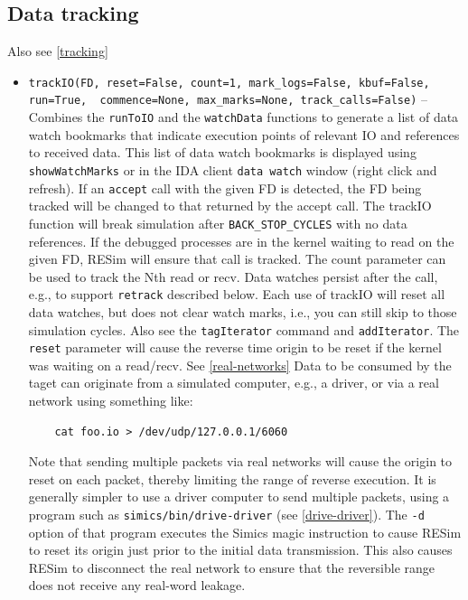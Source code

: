 \documentclass[titlepage]{article}
\begin{document}
\subsection{Data tracking}
Also see \ref{tracking}
\begin{itemize}

\item {\tt trackIO(FD, reset=False, count=1, mark\_logs=False, kbuf=False, run=True, \
             commence=None, max\_marks=None, track\_calls=False)} -- Combines the {\tt runToIO} and the {\tt watchData} functions to generate a list of data watch bookmarks that indicate execution
points of relevant IO and references to received data.  This list of data watch bookmarks is displayed using {\tt showWatchMarks} or in the IDA client {\tt data watch} window (right click and refresh).
If an {\tt accept} call with the given FD is detected, the FD being tracked will be changed to that returned by the accept call.
The trackIO function will break simulation after {\tt BACK\_STOP\_CYCLES} with no data references. If the debugged processes are in the kernel waiting to read on the given
FD, RESim will ensure that call is tracked.  The count parameter can be used to track the Nth read or recv.   Data watches persist after the
call, e.g., to support {\tt retrack} described below.  Each use of trackIO will reset all data watches, but does not clear watch marks, i.e., you can still skip to those simulation cycles.  Also see 
the {\tt tagIterator} command and {\tt addIterator}.  The {\tt reset} parameter will cause the reverse time origin to be reset if the kernel was waiting on a read/recv. See \ref{real-networks}  Data to be consumed by the taget can originate from a simulated computer, e.g., a driver, or via a real network using something like:
\begin{verbatim}
    cat foo.io > /dev/udp/127.0.0.1/6060 
\end{verbatim}
\noindent Note that sending multiple packets via real networks will cause the origin to reset on each packet, thereby limiting the range of reverse execution.  It is generally simpler
to use a driver computer to send multiple packets, using a program such as {\tt simics/bin/drive-driver} (see \ref{drive-driver}).  The {\tt -d} option of that program executes the Simics magic instruction to cause RESim to reset
its origin just prior to the initial data transmission.  This also causes RESim to disconnect the real network to ensure that the reversible range does not receive any real-word leakage.


\end{itemize}
\end{document}
